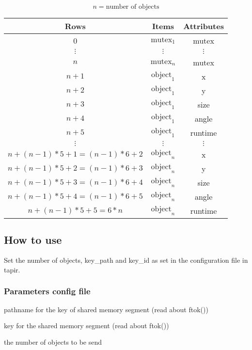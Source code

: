 \begin{displaymath}
    n = \mbox{number of objects}
\end{displaymath}
\begin{center}
\begin{tabular}{c|c|c}
\label{tab:mosmc:ms}
   {\bf Rows }      & {\bf Items }  & {\bf Attributes} \\ \hline
   0                & $\mbox{mutex}_1$  & mutex \\ \hline
   $\vdots$         & $\vdots$          & $\vdots$      \\ \hline  
   $n$              & $\mbox{mutex}_n$  & mutex \\ \hline
   $n+1$            & $\mbox{object}_1$ & x \\ \hline
   $n+2$            & $\mbox{object}_1$ & y \\ \hline
   $n+3$            & $\mbox{object}_1$ & size \\ \hline 
   $n+4$            & $\mbox{object}_1$ & angle \\ \hline
   $n+5$            & $\mbox{object}_1$ & runtime \\ \hline
   $\vdots$         & $\vdots$ & $\vdots$ \\ \hline
   $n + (n-1)*5 +1 = (n-1)*6+2 $ & $\mbox{object}_n$ & x \\ \hline
   $n + (n-1)*5 +2 = (n-1)*6+3$ & $\mbox{object}_n$ & y \\ \hline
   $n + (n-1)*5 +3 = (n-1)*6+4$ & $\mbox{object}_n$ & size \\ \hline 
   $n + (n-1)*5 +4 = (n-1)*6+5$ & $\mbox{object}_n$ & angle \\ \hline
   $n + (n-1)*5 +5 = 6*n$ & $\mbox{object}_n$ & runtime
\end{tabular}
\end{center}

\subsection{How to use}
\label{sec:mosmc:howto}

Set the number of objects, key\_path and key\_id as set in the 
configuration file in tapir.

\subsubsection{Parameters config file}
\label{sec:mosmc:howto:params}

    \begin{description} \itemindent=-15pt
        \item[key\_path] pathname for the key of shared memory segment 
                (read about ftok())
        \item[key\_id] key for the shared memory segment (read about ftok())
        \item[nb\_objects] the number of objects to be send
    \end{description}
